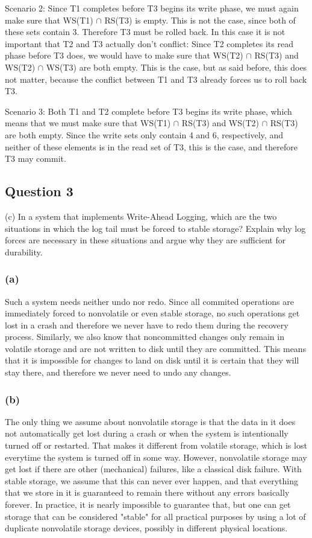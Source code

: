 \documentclass[12pt,a4paper]{article}
\begin{document}
Scenario 2:
Since T1 completes before T3 begins its write phase, we must again make sure that WS(T1) $\cap$ RS(T3) is empty. This is not the case, since both of these sets contain 3. Therefore T3 must be rolled back. In this case it is not important that T2 and T3 actually don't conflict: Since T2 completes its read phase before T3 does, we would have to make sure that WS(T2) $\cap$ RS(T3) and WS(T2) $\cap$ WS(T3) are both empty. This is the case, but as said before, this does not matter, because the conflict between T1 and T3 already forces us to roll back T3.
 
Scenario 3: 
Both T1 and T2 complete before T3 begins its write phase, which means that we must make sure that WS(T1) $\cap$ RS(T3) and WS(T2) $\cap$ RS(T3) are both empty. Since the write sets only contain 4 and 6, respectively, and neither of these elements is in the read set of T3, this is the case, and therefore T3 may commit.


\subsection*{Question 3}
\label{sec:eq3}

(c) In a system that implements Write-Ahead Logging, which are the two situations in which the log
tail must be forced to stable storage? Explain why log forces are necessary in these situations and
argue why they are sufficient for durability.

\subsubsection*{(a)}
Such a system needs neither undo nor redo. Since all commited operations are immediately forced to nonvolatile or even stable storage, no such operations get lost in a crash and therefore we never have to redo them during the recovery process. Similarly, we also know that noncommitted changes only remain in volatile storage and are not written to disk until they are committed. This means that it is impossible for changes to land on disk until it is certain that they will stay there, and therefore we never need to undo any changes.

\subsubsection*{(b)}
The only thing we assume about nonvolatile storage is that the data in it does not automatically get lost during a crash or when the system is intentionally turned off or restarted. That makes it different from volatile storage, which is lost everytime the system is turned off in some way. However, nonvolatile storage may get lost if there are other (mechanical) failures, like a classical disk failure. With stable storage, we assume that this can never ever happen, and that everything that we store in it is guaranteed to remain there without any errors basically forever. In practice, it is nearly impossible to guarantee that, but one can get storage that can be considered "stable" for all practical purposes by using a lot of duplicate nonvolatile storage devices, possibly in different physical locations.
\end{document}
